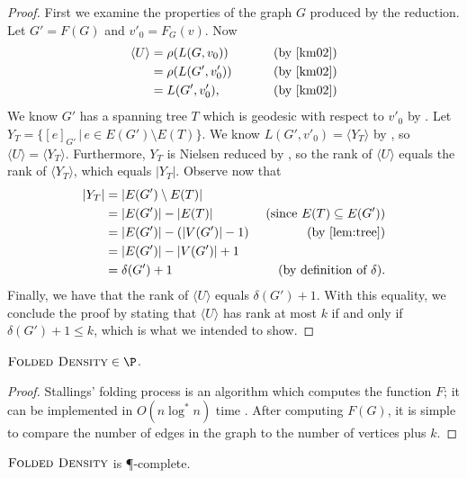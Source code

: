 \documentclass{article}
\newcommand{\FD}{\textsc{Folded Density}}
\newcommand{\gen}[1]{\langle #1 \rangle}
\begin{document}
\begin{proof}
  First we examine the properties of the graph $G$ produced by the reduction.
  Let $G' = F(G)$ and $v'_0 = F_G(v)$.
  Now
  \begin{align*}
    \gen{U} & = \rho(L(G, v_0)) & \qquad \text{ (by \cite[Proposition~3.8]{km02})} \\
            & = \rho(L(G', v'_0)) & \qquad \text{ (by \cite[Lemma~3.4]{km02})} \\
            & = L(G', v'_0), & \qquad \text{ (by \cite[Lemma~2.9]{km02})}
  \end{align*}
  We know $G'$ has a spanning tree $T$ which is geodesic with respect to $v'_0$ by \cite[Lemma~6.6]{km02}.
  Let $Y_T = \{[e]_{G'} \, | \, e \in E(G') \setminus E(T) \}$.
  We know $L(G', v'_0) = \gen{Y_T}$ by \cite[Lemma~6.1]{km02}, so $\gen{U} = \gen{Y_T}$.
  Furthermore, $Y_T$ is Nielsen reduced by \cite[Proposition~6.7]{km02}, so the rank of $\gen{U}$ equals the rank of $\gen{Y_T}$, which equals $|Y_T|$.
  Observe now that
  \begin{align*}
    |Y_T| & = |E(G') \setminus E(T)| & \\
          & = |E(G')| - |E(T)| & \text{ (since } E(T) \subseteq E(G') \text{)} \\
          & = |E(G')| - (|V(G')| - 1) & \text{ (by \autoref{lem:tree})} \\
          & = |E(G')| - |V(G')| + 1 & \\
          & = \delta(G') + 1 & \text{ (by definition of } \delta \text{)}.
  \end{align*}
  Finally, we have that the rank of $\gen{U}$ equals $\delta(G') + 1$.
  With this equality, we conclude the proof by stating that $\gen{U}$ has rank at most $k$ if and only if $\delta(G') + 1 \leq k$, which is what we intended to show.
\end{proof}

\begin{theorem}
  $\FD \in \P$.
\end{theorem}
\begin{proof}
  Stallings' folding process \cite[Algorithm~5.4]{stallings83} is an algorithm which computes the function $F$; it can be implemented in $O(n \log^* n)$ time \cite{touikan06}.
  After computing $F(G)$, it is simple to compare the number of edges in the graph to the number of vertices plus $k$.
\end{proof}

\begin{corollary}
  $\FD$ is \P-complete.
\end{corollary}



\end{document}
